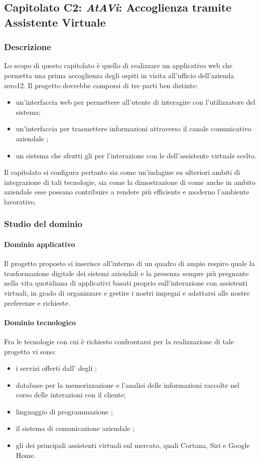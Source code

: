 	\subsection{Capitolato C2: \emph{AtAVi}: Accoglienza tramite Assistente Virtuale}
		\subsubsection{Descrizione}
		Lo scopo di questo capitolato è quello di realizzare un applicativo web che permetta una prima accoglienza degli ospiti in visita all'ufficio 
		dell'azienda zero12. Il progetto dovrebbe comporsi di tre parti ben distinte: 
		\begin{itemize}
			\item un'interfaccia web per permettere all'utente di interagire con l'utilizzatore del sistema;
			\item un'interfaccia per trasmettere informazioni attraverso il canale comunicativo aziendale ;
			\item un sistema che sfrutti gli  per l'interazione con le  dell'assistente virtuale scelto.
		\end{itemize}
		Il capitolato si configura pertanto sia come un'indagine su ulteriori ambiti di integrazione di tali tecnologie, sia come la dimostrazione 
		di come anche in ambito aziendale esse possano contribuire a rendere più efficiente e moderno l'ambiente lavorativo.
		\subsubsection{Studio del dominio}
			\paragraph{Dominio applicativo}
			Il progetto proposto si inserisce all'interno di un quadro di ampio respiro quale la trasformazione digitale dei sistemi aziendali e la 
			presenza sempre più pregnante nella vita quotidiana di applicativi basati proprio sull'interazione con assistenti virtuali, in grado di 
			organizzare e gestire i nostri impegni e adattarsi alle nostre preferenze e richieste.
			
			\paragraph{Dominio tecnologico}
			Fra le tecnologie con cui è richiesto confrontarsi per la realizzazione di tale progetto vi sono:
			\begin{itemize}
				\item i servizi offerti dall' degli ;
				\item database  per la memorizzazione e l'analisi delle informazioni raccolte nel corso delle interazioni con il cliente;
				\item linguaggio di programmazione ;
				\item il sistema di comunicazione aziendale ;
				\item gli  dei principali assistenti virtuali sul mercato, quali Cortana, Siri e Google Home.
			\end{itemize}
